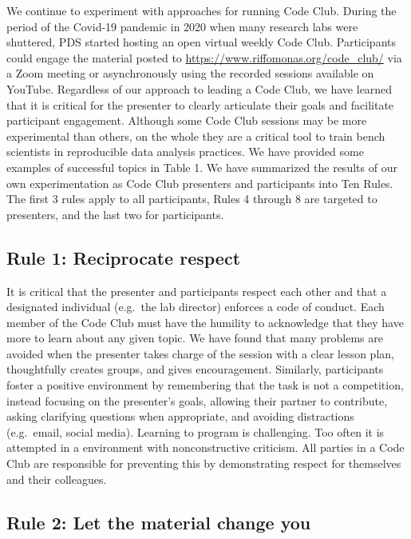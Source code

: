 \documentclass[
  11pt,
]{article}
\begin{document}
We continue to experiment with approaches for running Code Club. During
the period of the Covid-19 pandemic in 2020 when many research labs were
shuttered, PDS started hosting an open virtual weekly Code Club.
Participants could engage the material posted to
\url{https://www.riffomonas.org/code_club/} via a Zoom meeting or
asynchronously using the recorded sessions available on YouTube.
Regardless of our approach to leading a Code Club, we have learned that
it is critical for the presenter to clearly articulate their goals and
facilitate participant engagement. Although some Code Club sessions may
be more experimental than others, on the whole they are a critical tool
to train bench scientists in reproducible data analysis practices. We
have provided some examples of successful topics in Table 1. We have
summarized the results of our own experimentation as Code Club
presenters and participants into Ten Rules. The first 3 rules apply to
all participants, Rules 4 through 8 are targeted to presenters, and the
last two for participants.

\hypertarget{rule-1-reciprocate-respect}{%
\subsection{Rule 1: Reciprocate
respect}\label{rule-1-reciprocate-respect}}

It is critical that the presenter and participants respect each other
and that a designated individual (e.g.~the lab director) enforces a code
of conduct. Each member of the Code Club must have the humility to
acknowledge that they have more to learn about any given topic. We have
found that many problems are avoided when the presenter takes charge of
the session with a clear lesson plan, thoughtfully creates groups, and
gives encouragement. Similarly, participants foster a positive
environment by remembering that the task is not a competition, instead
focusing on the presenter's goals, allowing their partner to contribute,
asking clarifying questions when appropriate, and avoiding distractions
(e.g.~email, social media). Learning to program is challenging. Too
often it is attempted in a environment with nonconstructive criticism.
All parties in a Code Club are responsible for preventing this by
demonstrating respect for themselves and their colleagues.

\hypertarget{rule-2-let-the-material-change-you}{%
\subsection{Rule 2: Let the material change
you}\label{rule-2-let-the-material-change-you}}
\end{document}
